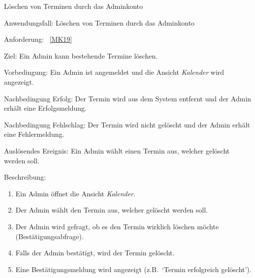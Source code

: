 \pagebreak

\begin{function}{50}{Löschen von Terminen durch das Adminkonto}
    \item[Anwendungsfall:] Löschen von Terminen durch das Adminkonto
    \item[Anforderung:] ~\ref{MK19}
    \item[Ziel:] Ein Admin kann bestehende Termine löschen.
    \item[Vorbedingung:] Ein Admin ist angemeldet und die Ansicht \textit{Kalender} wird angezeigt.
    \item[Nachbedingung Erfolg:] Der Termin wird aus dem System entfernt und der Admin erhält eine Erfolgsmeldung.
    \item[Nachbedingung Fehlschlag:] Der Termin wird nicht gelöscht und der Admin erhält eine Fehlermeldung.
    \item[Auslösendes Ereignis:] Ein Admin wählt einen Termin aus, welcher gelöscht werden soll.
    \item[Beschreibung:] ~
    \begin{enumerate}
        \item Ein Admin öffnet die Ansicht \textit{Kalender}.
        \item Der Admin wählt den Termin aus, welcher gelöscht werden soll.
        \item Der Admin wird gefragt, ob es den Termin wirklich löschen möchte (Bestätigungsabfrage).
        \item Falls der Admin bestätigt, wird der Termin gelöscht.
        \item Eine Bestätigungsmeldung wird angezeigt (z.B.\ `Termin erfolgreich gelöscht').
    \end{enumerate}
\end{function}

\pagebreak

